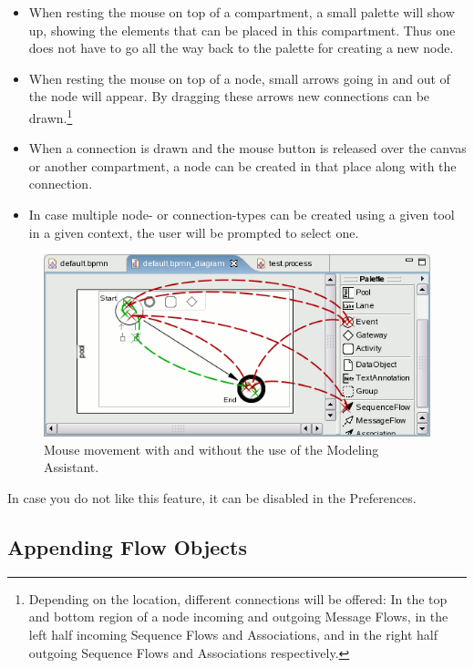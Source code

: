 \begin{itemize}
	\item When resting the mouse on top of a compartment, a small palette will
	show up, showing the elements that can be placed in this compartment.  Thus
	one does not have to go all the way back to the palette for creating a new
	node.

	\item When resting the mouse on top of a node, small arrows going in and out
	of the node will appear.  By dragging these arrows new connections can be
	drawn.\footnote{Depending on the location, different connections will be
	offered: In the top and bottom region of a node incoming and outgoing Message
	Flows, in the left half incoming Sequence Flows and Associations, and in the
	right half outgoing Sequence Flows and Associations respectively.}

	\item When a connection is drawn and the mouse button is released over the
	canvas or another compartment, a node can be created in that place along with
	the connection.

	\item In case multiple node- or connection-types can be created using a given
	tool in a given context, the user will be prompted to select one.
\end{itemize}

\begin{figure}[ht]
	\centering
	\includegraphics[width=.5\textwidth]{figures/features/modellingAssistant.png}
	\caption{Mouse movement with and without the use of the Modeling Assistant.}
	\label{fig:modAss}
\end{figure}

In case you do not like this feature, it can be disabled in the Preferences.



\subsection{Appending Flow Objects}

